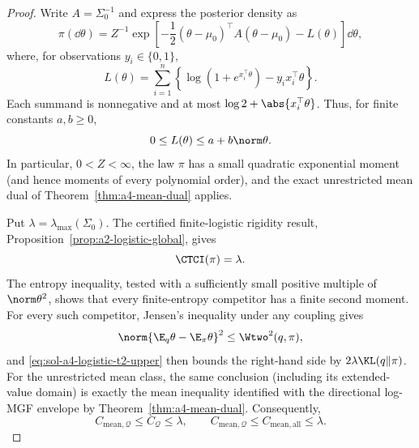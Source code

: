 \documentclass[../main.tex]{subfiles}
\begin{document}
\begin{proof}
Write $A=\Sigma_0^{-1}$ and express the posterior density as
\begin{equation}\label{eq:sol-a4-logistic-posterior}
 \pi(\dd\theta)=Z^{-1}\exp\!\left[-\frac12
 (\theta-\mu_0)^\top A(\theta-\mu_0)-L(\theta)\right]\dd\theta,
\end{equation}
where, for observations $y_i\in\{0,1\}$,
\[
 L(\theta)=\sum_{i=1}^n
 \left\{\log(1+e^{x_i^\top\theta})-y_i x_i^\top\theta\right\}.
\]
Each summand is nonnegative and at most $\log 2+\abs{x_i^\top\theta}$.  Thus, for finite
constants $a,b\ge0$,
\begin{equation}\label{eq:sol-a4-logistic-linear-growth}
 0\le L(\theta)\le a+b\norm\theta.
\end{equation}
In particular, $0<Z<\infty$, the law $\pi$ has a small quadratic exponential moment (and hence
moments of every polynomial order), and the exact unrestricted mean dual of
Theorem~\ref{thm:a4-mean-dual} applies.

Put $\lambda=\lambda_{\max}(\Sigma_0)$.  The certified finite-logistic rigidity result,
Proposition~\ref{prop:a2-logistic-global}, gives
\begin{equation}\label{eq:sol-a4-logistic-t2-upper}
 \CTCI(\pi)=\lambda.
\end{equation}
The entropy inequality, tested with a sufficiently small positive multiple of
$\norm\theta^2$, shows that every finite-entropy competitor has a finite second moment.  For
every such competitor, Jensen's inequality under any coupling gives
\[
 \norm{\E_q\theta-\E_\pi\theta}^2\le \Wtwo^2(q,\pi),
\]
and \eqref{eq:sol-a4-logistic-t2-upper} then bounds the right-hand side by
$2\lambda\KL(q\|\pi)$.  For the unrestricted mean class, the same conclusion (including its
extended-value domain) is exactly the mean inequality identified with the directional
log-MGF envelope by Theorem~\ref{thm:a4-mean-dual}.  Consequently,
\begin{equation}\label{eq:sol-a4-logistic-upper-chain}
 C_{\mathrm{mean},\mathcal Q}\le C_{\mathcal Q}\le\lambda,
 \qquad
 C_{\mathrm{mean},\mathcal Q}\le C_{\mathrm{mean},\mathrm{all}}\le\lambda.
\end{equation}


\end{proof}
\end{document}
